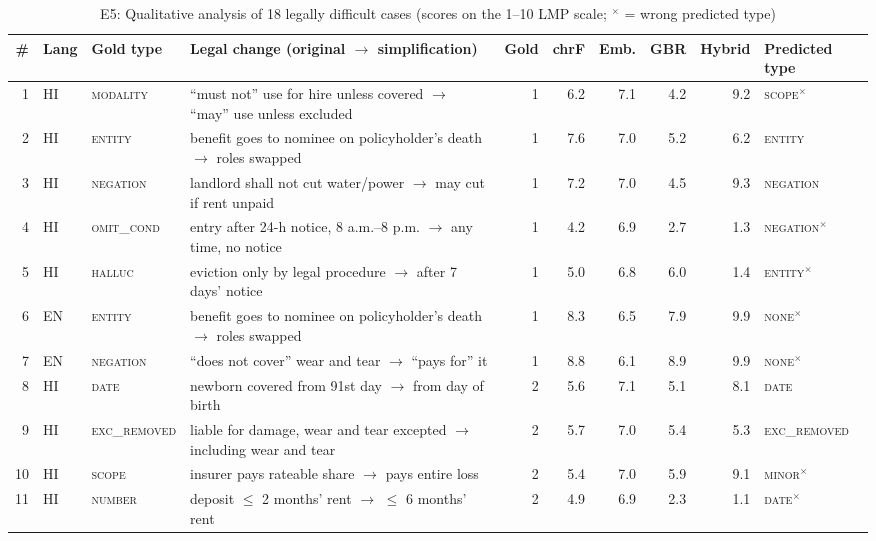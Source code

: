 \begin{table}[t]
\caption{E5: Qualitative analysis of 18 legally difficult cases (scores on the 1--10 LMP scale; $^{\times}$ = wrong predicted type)}\label{tab:cases}
\centering\footnotesize\setlength{\tabcolsep}{4pt}
\begin{tabular}{@{}rllp{7.4cm}rrrrrl@{}}
\toprule
\# & Lang & Gold type & Legal change (original $\rightarrow$ simplification) & Gold & chrF & Emb. & GBR & Hybrid & Predicted type\\
\midrule
1 & HI & \textsc{modality} & ``must not'' use for hire unless covered $\rightarrow$ ``may'' use unless excluded & 1 & 6.2 & 7.1 & 4.2 & 9.2 & \textsc{scope}$^{\times}$ \\
2 & HI & \textsc{entity} & benefit goes to nominee on policyholder's death $\rightarrow$ roles swapped & 1 & 7.6 & 7.0 & 5.2 & 6.2 & \textsc{entity} \\
3 & HI & \textsc{negation} & landlord shall not cut water/power $\rightarrow$ may cut if rent unpaid & 1 & 7.2 & 7.0 & 4.5 & 9.3 & \textsc{negation} \\
4 & HI & \textsc{omit\_cond} & entry after 24-h notice, 8 a.m.--8 p.m. $\rightarrow$ any time, no notice & 1 & 4.2 & 6.9 & 2.7 & 1.3 & \textsc{negation}$^{\times}$ \\
5 & HI & \textsc{halluc} & eviction only by legal procedure $\rightarrow$ after 7 days' notice & 1 & 5.0 & 6.8 & 6.0 & 1.4 & \textsc{entity}$^{\times}$ \\
6 & EN & \textsc{entity} & benefit goes to nominee on policyholder's death $\rightarrow$ roles swapped & 1 & 8.3 & 6.5 & 7.9 & 9.9 & \textsc{none}$^{\times}$ \\
7 & EN & \textsc{negation} & ``does not cover'' wear and tear $\rightarrow$ ``pays for'' it & 1 & 8.8 & 6.1 & 8.9 & 9.9 & \textsc{none}$^{\times}$ \\
8 & HI & \textsc{date} & newborn covered from 91st day $\rightarrow$ from day of birth & 2 & 5.6 & 7.1 & 5.1 & 8.1 & \textsc{date} \\
9 & HI & \textsc{exc\_removed} & liable for damage, wear and tear excepted $\rightarrow$ including wear and tear & 2 & 5.7 & 7.0 & 5.4 & 5.3 & \textsc{exc\_removed} \\
10 & HI & \textsc{scope} & insurer pays rateable share $\rightarrow$ pays entire loss & 2 & 5.4 & 7.0 & 5.9 & 9.1 & \textsc{minor}$^{\times}$ \\
11 & HI & \textsc{number} & deposit $\le$ 2 months' rent $\rightarrow$ $\le$ 6 months' rent & 2 & 4.9 & 6.9 & 2.3 & 1.1 & \textsc{date}$^{\times}$ \\

\end{tabular}
\end{table}
